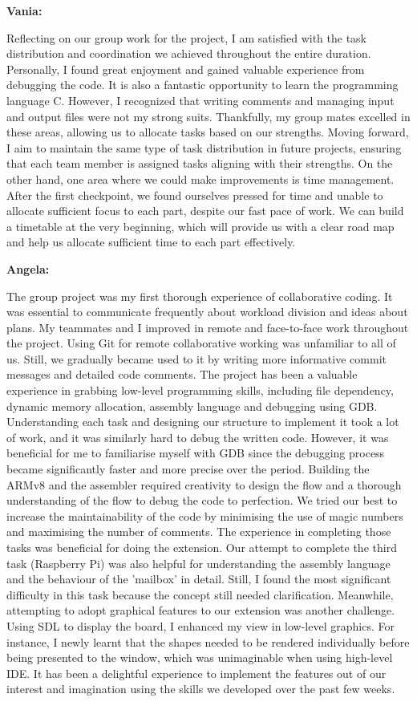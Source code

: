 \documentclass{article}
\begin{document}
\textbf{Vania:}

Reflecting on our group work for the project, I am satisfied with the task distribution and coordination we achieved throughout the entire duration. Personally, I found great enjoyment and gained valuable experience from debugging the code. It is also a fantastic opportunity to learn the programming language C. However, I recognized that writing comments and managing input and output files were not my strong suits. Thankfully, my group mates excelled in these areas, allowing us to allocate tasks based on our strengths. Moving forward, I aim to maintain the same type of task distribution in future projects, ensuring that each team member is assigned tasks aligning with their strengths. On the other hand, one area where we could make improvements is time management. After the first checkpoint, we found ourselves pressed for time and unable to allocate sufficient focus to each part, despite our fast pace of work. We can build a timetable at the very beginning, which will provide us with a clear road map and help us allocate sufficient time to each part effectively. 

\textbf{Angela:}

The group project was my first thorough experience of collaborative coding. It was essential to communicate frequently about workload division and ideas about plans. My teammates and I improved in remote and face-to-face work throughout the project. Using Git for remote collaborative working was unfamiliar to all of us. Still, we gradually became used to it by writing more informative commit messages and detailed code comments. The project has been a valuable experience in grabbing low-level programming skills, including file dependency, dynamic memory allocation, assembly language and debugging using GDB. Understanding each task and designing our structure to implement it took a lot of work, and it was similarly hard to debug the written code. However, it was beneficial for me to familiarise myself with GDB since the debugging process became significantly faster and more precise over the period. Building the ARMv8 and the assembler required creativity to design the flow and a thorough understanding of the flow to debug the code to perfection. We tried our best to increase the maintainability of the code by minimising the use of magic numbers and maximising the number of comments. The experience in completing those tasks was beneficial for doing the extension. Our attempt to complete the third task (Raspberry Pi) was also helpful for understanding the assembly language and the behaviour of the 'mailbox' in detail. Still, I found the most significant difficulty in this task because the concept still needed clarification. Meanwhile, attempting to adopt graphical features to our extension was another challenge. Using SDL to display the board, I enhanced my view in low-level graphics. For instance, I newly learnt that the shapes needed to be rendered individually before being presented to the window, which was unimaginable when using high-level IDE. It has been a delightful experience to implement the features out of our interest and imagination using the skills we developed over the past few weeks. 
\end{document}
